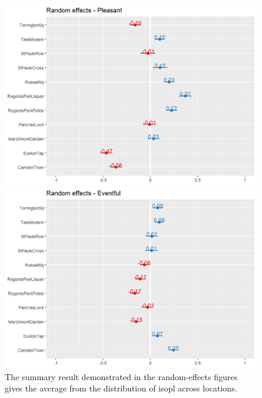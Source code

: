 \begin{figure}[!h]
  \centering

  \begin{minipage}{.5\textwidth}
    \includegraphics[width=\linewidth]{Figures/whoRandPlNew.png}
  \end{minipage}%
  \begin{minipage}{.5\textwidth}
    \centering
    \includegraphics[width=\linewidth]{Figures/whoRandEvNew.png}
  \end{minipage}
  \caption{The summary result demonstrated in the random-effects figures gives the average from the distribution of \gls{isopl} across locations.\label{fig:whoRand}}

\end{figure}


